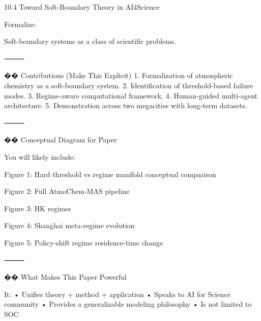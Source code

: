 10.4 Toward Soft-Boundary Theory in AI4Science

Formalize:

Soft-boundary systems as a class of scientific problems.

⸻

�� Contributions (Make This Explicit)
	1.	Formalization of atmospheric chemistry as a soft-boundary system.
	2.	Identification of threshold-based failure modes.
	3.	Regime-aware computational framework.
	4.	Human-guided multi-agent architecture.
	5.	Demonstration across two megacities with long-term datasets.

⸻

�� Conceptual Diagram for Paper

You will likely include:

Figure 1:
Hard threshold vs regime manifold conceptual comparison

Figure 2:
Full AtmoChem-MAS pipeline

Figure 3:
HK regimes

Figure 4:
Shanghai meta-regime evolution

Figure 5:
Policy-shift regime residence-time change

⸻

�� What Makes This Paper Powerful

It:
	•	Unifies theory + method + application
	•	Speaks to AI for Science community
	•	Provides a generalizable modeling philosophy
	•	Is not limited to SOC
